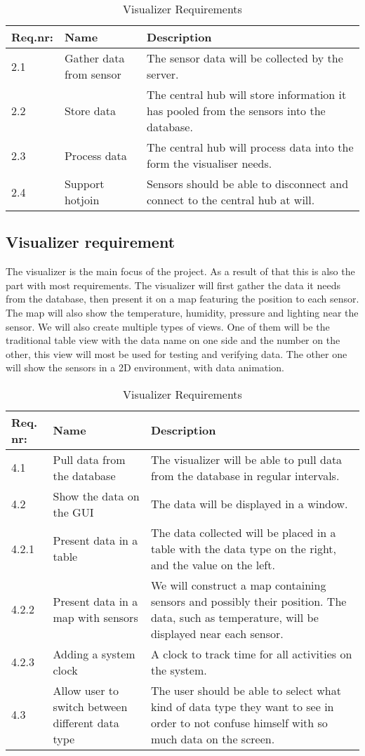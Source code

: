 \documentclass[../document]{subfiles}
\begin{document}
\begin{table}[H]
\caption{Visualizer Requirements}
\centering
\begin{tabularx}{\textwidth}{|l|X|X|}
\hline
Req.nr:
&Name
&Description
\\ \hline 2.1
&Gather data from sensor
&The sensor data will be collected by the server.
\\ \hline 2.2
&Store data
&The central hub will store information it has pooled from the sensors into the database.
\\ \hline 2.3
&Process data 
&The central hub will process data into the form the visualiser needs.
\\ \hline 2.4
&Support hotjoin
&Sensors should be able to disconnect and connect to the central hub at will.
\\ \hline 
\end{tabularx}
\end{table}

\subsection{Visualizer requirement}
The visualizer is the main focus of the project. As a result of that this is also the part with most requirements. The visualizer will first gather the data it needs from the database, then present it on a map featuring the position to each sensor. The map will also show the temperature, humidity, pressure and lighting near the sensor. We will also create multiple types of views. One of them will be the traditional table view with the data name on one side and the number on the other, this view will most be used for testing and verifying data. The other one will show the sensors in a 2D environment, with data animation.

\begin{table}[H]
\caption{Visualizer Requirements}
\centering
\begin{tabularx}{\textwidth}{|l|X|X|}
\hline
Req. nr:
&Name
&Description
\\ \hline 4.1
&Pull data from the database
&The visualizer will be able to pull data from the database in regular intervals.
\\ \hline 4.2
&Show the data on the GUI
&The data will be displayed in a window.
\\ \hline 4.2.1
&Present data in a table
&The data collected will be placed in a table with the data type on the right, and the value on the left.
\\ \hline 4.2.2
&Present data in a map with sensors
&We will construct a map containing sensors and possibly their position. The data, such as temperature, will be displayed near each sensor.
\\ \hline 4.2.3
&Adding a system clock
&A clock to track time for all activities on the system.
\\ \hline 4.3
&Allow user to switch between different data type
&The user should be able to select what kind of data type they want to see in order to not confuse himself with so much data on the screen.
\\ \hline 
\end{tabularx}
\end{table}
\end{document}
